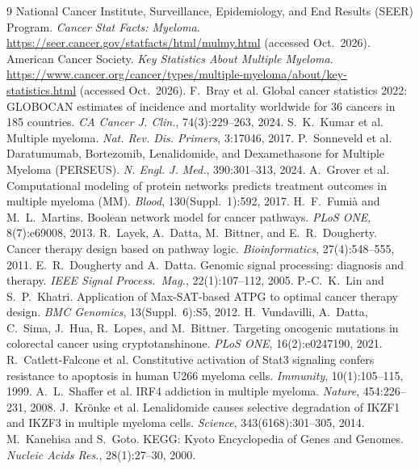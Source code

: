 \documentclass[conference,letterpaper]{IEEEtran}
\begin{document}
\begin{thebibliography}{9}
 National Cancer Institute, Surveillance, Epidemiology, and End
Results (SEER) Program. \emph{Cancer Stat Facts: Myeloma}.
\url{https://seer.cancer.gov/statfacts/html/mulmy.html} (accessed Oct.\ 2026).
 American Cancer Society. \emph{Key Statistics About Multiple
Myeloma}.
\url{https://www.cancer.org/cancer/types/multiple-myeloma/about/key-statistics.html} (accessed Oct.\ 2026).
 F.~Bray et al. Global cancer statistics 2022: GLOBOCAN
estimates of incidence and mortality worldwide for 36 cancers in 185 countries.
\emph{CA Cancer J. Clin.}, 74(3):229--263, 2024.
 S.~K.~Kumar et al. Multiple myeloma.
\emph{Nat. Rev. Dis. Primers}, 3:17046, 2017.
 P.~Sonneveld et al. Daratumumab, Bortezomib, Lenalidomide,
and Dexamethasone for Multiple Myeloma (PERSEUS). \emph{N. Engl. J. Med.},
390:301--313, 2024.
 A.~Grover et al. Computational modeling of protein networks
predicts treatment outcomes in multiple myeloma (MM). \emph{Blood},
130(Suppl.~1):592, 2017.   %
 H.~F.~Fumi\`a and M.~L.~Martins. Boolean network model for
cancer pathways. \emph{PLoS ONE}, 8(7):e69008, 2013.
 R.~Layek, A.~Datta, M.~Bittner, and E.~R.~Dougherty. Cancer
therapy design based on pathway logic. \emph{Bioinformatics}, 27(4):548--555, 2011.
 E.~R.~Dougherty and A.~Datta. Genomic signal processing: diagnosis
and therapy. \emph{IEEE Signal Process.\ Mag.}, 22(1):107--112, 2005.
 P.-C.~K.~Lin and S.~P.~Khatri. Application of Max-SAT-based
ATPG to optimal cancer therapy design. \emph{BMC Genomics}, 13(Suppl.~6):S5, 2012.
 H.~Vundavilli, A.~Datta, C.~Sima, J.~Hua, R.~Lopes, and
M.~Bittner. Targeting oncogenic mutations in colorectal cancer using
cryptotanshinone. \emph{PLoS ONE}, 16(2):e0247190, 2021.
 R.~Catlett-Falcone et al. Constitutive activation of Stat3
signaling confers resistance to apoptosis in human U266 myeloma cells.
\emph{Immunity}, 10(1):105--115, 1999.
 A.~L.~Shaffer et al. IRF4 addiction in multiple myeloma.
\emph{Nature}, 454:226--231, 2008.
 J.~Kr\"onke et al. Lenalidomide causes selective degradation
of IKZF1 and IKZF3 in multiple myeloma cells. \emph{Science},
343(6168):301--305, 2014.
 M.~Kanehisa and S.~Goto. KEGG: Kyoto Encyclopedia of Genes and
Genomes. \emph{Nucleic Acids Res.}, 28(1):27--30, 2000.

\end{thebibliography}
\end{document}
